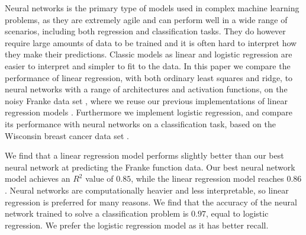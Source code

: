 Neural networks is the primary type of models used in complex machine learning problems, as they are extremely agile and can perform well in a wide range of scenarios, including both regression and classification tasks.
They do however require large amounts of data to be trained and it is often hard to interpret how they make their predictions.
Classic models as linear and logistic regression are easier to interpret and simpler to fit to the data.
In this paper we compare the performance of linear regression, with both ordinary least squares and ridge, to neural networks with a range of architectures and activation functions, on the noisy Franke data set \cite{frank}, where we reuse our previous implementations of linear regression models \cite{project1}.
Furthermore we implement logistic regression, and compare its performance with neural networks on a classification task, based on the Wisconsin breast cancer data set \cite{breast_cancer_wisconsin}.

We find that a linear regression model performs slightly better than our best neural network at predicting the Franke function data. 
Our best neural network model achieves an $R^2$ value of $0.85$, while the linear regression model reaches $0.86$.
Neural networks are computationally heavier and less interpretable, so linear regression is preferred for many reasons. 
We find that the accuracy of the neural network trained to solve a classification problem is $0.97$, equal to logistic regression. We prefer the logistic regression model as it has better recall.


